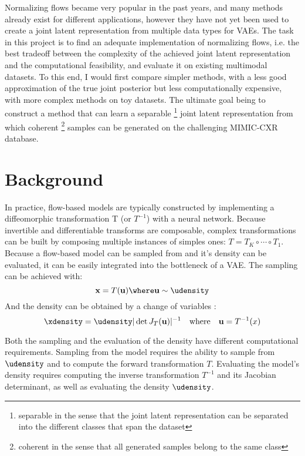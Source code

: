 \documentclass[english]{scrartcl}
\begin{document}
    Normalizing flows became very popular in the past years, and many methods already exist for different applications, however they have not yet been used to create a joint latent representation from multiple data types for VAEs.
    The task in this project is to find an adequate implementation of normalizing flows, i.e. the best tradeoff between the complexity of the achieved joint latent representation and the computational feasibility, and evaluate it on existing multimodal datasets.
    To this end, I would first compare simpler methods, with a less good approximation of the true joint posterior but less computationally expensive, with more complex methods on toy datasets.
    The ultimate goal being to construct a method that can learn a separable \footnote{separable in the sense that the joint latent representation can be separated into the different classes that span the dataset} joint latent representation from which coherent \footnote{coherent in the sense that all generated samples belong to the same class} samples can be generated on the challenging MIMIC-CXR \parencite{johnson_mimic-cxr-jpg_2019} database.


    \section{Background}
    In practice, flow-based models are typically constructed by implementing a diffeomorphic transformation T (or $T^{-1}$) with a neural network.
    Because invertible and differentiable transforms are composable, complex transformations can be built by composing multiple instances of simples ones: $T=T_K \circ \cdots \circ T_1$.
    Because a flow-based model can be sampled from and it's density can be evaluated, it can be easily integrated into the bottleneck of a VAE.
    The sampling can be achieved with:
    \begin{equation}
        \textbf{x} = T(\textbf{u}) \where \textbf{u} \sim \udensity
    \end{equation}
    And the density can be obtained by a change of variables \parencite{bogachev2007measure}:
    \begin{equation}
        \label{eq:density}
        \xdensity = \udensity |\det J_T(\textbf{u})|^{-1} \quad \text{where} \quad \textbf{u} = T^{-1}(x)
    \end{equation}

    Both the sampling and the evaluation of the density have different computational requirements.
    Sampling from the model requires the ability to sample from $\udensity$ and to compute the forward transformation $T$.
    Evaluating the model's density requires computing the inverse transformation $T^{-1}$ and its Jacobian determinant, as well as evaluating the density $\udensity$.
\end{document}
